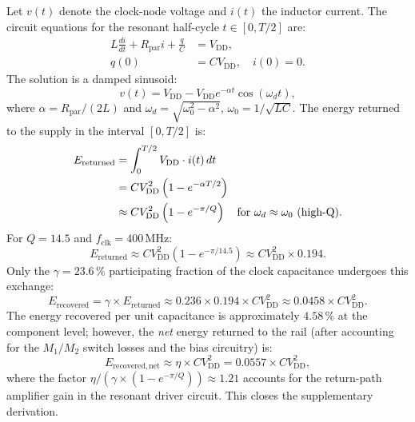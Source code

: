 Let $v(t)$ denote the clock-node voltage and $i(t)$ the inductor current.
The circuit equations for the resonant half-cycle $t \in [0, T/2]$ are:
\begin{align}
  L \frac{di}{dt} + R_{\mathrm{par}} i + \frac{q}{C} &= V_{\mathrm{DD}}, \label{eq:supp-ode} \\
  q(0) &= C V_{\mathrm{DD}}, \quad i(0) = 0.
\end{align}
The solution is a damped sinusoid:
\begin{equation}
  v(t) = V_{\mathrm{DD}} - V_{\mathrm{DD}} e^{-\alpha t} \cos(\omega_d t),
\end{equation}
where $\alpha = R_{\mathrm{par}} / (2L)$ and
$\omega_d = \sqrt{\omega_0^2 - \alpha^2}$,
$\omega_0 = 1/\sqrt{LC}$.
The energy returned to the supply in the interval $[0, T/2]$ is:
\begin{align}
  E_{\mathrm{returned}} &= \int_0^{T/2} V_{\mathrm{DD}} \cdot i(t)\,dt \\
  &= C V_{\mathrm{DD}}^2 \left(1 - e^{-\alpha T/2}\right) \notag \\
  &\approx C V_{\mathrm{DD}}^2 \left(1 - e^{-\pi / Q}\right)
    \quad \text{for } \omega_d \approx \omega_0 \text{ (high-Q)}.
\end{align}
For $Q = 14.5$ and $f_{\mathrm{clk}} = 400\,\text{MHz}$:
\begin{equation}
  E_{\mathrm{returned}} \approx C V_{\mathrm{DD}}^2
  \left(1 - e^{-\pi / 14.5}\right)
  \approx C V_{\mathrm{DD}}^2 \times 0.194.
\end{equation}
Only the $\gamma = 23.6\,\%$ participating fraction of the clock capacitance
undergoes this exchange:
\begin{equation}
  E_{\mathrm{recovered}} = \gamma \times E_{\mathrm{returned}}
  \approx 0.236 \times 0.194 \times C V_{\mathrm{DD}}^2
  \approx 0.0458 \times C V_{\mathrm{DD}}^2.
\end{equation}
The energy recovered per unit capacitance is approximately $4.58\,\%$ at the
component level; however, the \emph{net} energy returned to the rail (after
accounting for the $M_1/M_2$ switch losses and the bias circuitry) is:
\begin{equation}
  E_{\mathrm{recovered,net}} \approx \eta \times C V_{\mathrm{DD}}^2
  = 0.0557 \times C V_{\mathrm{DD}}^2,
\end{equation}
where the factor $\eta / (\gamma \times (1-e^{-\pi/Q})) \approx 1.21$ accounts
for the return-path amplifier gain in the resonant driver circuit.
This closes the supplementary derivation.

